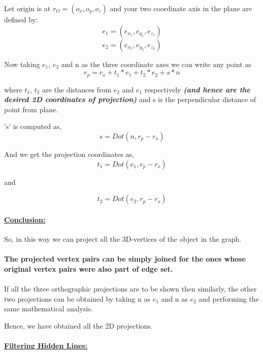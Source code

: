 \documentclass[12pt]{article}
\begin{document}
\bigskip
 Let origin is at $r_O = (o_x, o_y, o_z)$ and your two coordinate axis in the plane are defined by: $$e_1 = (e_{x_1},e_{y_1},e_{z_1})$$ $$    e_2 = (e_{x_2},e_{y_2},e_{z_2})$$
 
 Now taking $e_1$, $e_2$ and n as the three coordinate axes we can write any point as $$ r_p  = r_o + t_1*e_1 + t_2*e_2+s*n $$
 
where $t_1$, $t_2$ are the distances from $e_2$ and $e_1$ respectively \emph{\textbf{(and hence are the desired 2D coordinates of projection)}} and s is the perpendicular distance of point from plane.


\bigskip
's' is computed as,
$$ s = Dot(n, r_p - r_o) $$
 
\bigskip
 And we get the projection coordinates as, $$ t_1 =  Dot(e_1, r_p - r_o)$$
        \begin{center}and         \end{center}
        $$ t_2 = Dot(e_2,r_p - r_o) $$ 

\paragraph{\large{\underline{Conclusion:}}}So, in this way we can project all the 3D-vertices of the object in the graph.

\paragraph{The projected vertex pairs can be simply joined for the ones whose original vertex pairs were also part of edge set.}
\paragraph{}
If all the three orthographic projections are to be shown then
similarly, the other two projections can be obtained by taking n as $e_1$ and n as $e_2$ and performing the same mathematical analysis.

\begin{center}Hence, we have obtained all the 2D projections.\end{center}

\pagebreak

\paragraph{\large{\underline{Filtering Hidden Lines:}}}
\renewcommand\labelitemii{$\square$}
\end{document}
